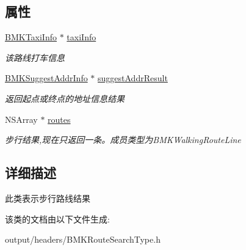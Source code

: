 \subsection*{属性}
\begin{DoxyCompactItemize}
\item 
\hypertarget{interface_b_m_k_walking_route_result_a64e1ed0711dbed93a53cce9f3fd5b477}{}\hyperlink{interface_b_m_k_taxi_info}{B\+M\+K\+Taxi\+Info} $\ast$ \hyperlink{interface_b_m_k_walking_route_result_a64e1ed0711dbed93a53cce9f3fd5b477}{taxi\+Info}\label{interface_b_m_k_walking_route_result_a64e1ed0711dbed93a53cce9f3fd5b477}

\begin{DoxyCompactList}\small\item\em 该路线打车信息 \end{DoxyCompactList}\item 
\hypertarget{interface_b_m_k_walking_route_result_aa609ce663bd13a0c2a96df209d3adc67}{}\hyperlink{interface_b_m_k_suggest_addr_info}{B\+M\+K\+Suggest\+Addr\+Info} $\ast$ \hyperlink{interface_b_m_k_walking_route_result_aa609ce663bd13a0c2a96df209d3adc67}{suggest\+Addr\+Result}\label{interface_b_m_k_walking_route_result_aa609ce663bd13a0c2a96df209d3adc67}

\begin{DoxyCompactList}\small\item\em 返回起点或终点的地址信息结果 \end{DoxyCompactList}\item 
\hypertarget{interface_b_m_k_walking_route_result_a5d3582bcf623a0a164e68d4bc9b329f3}{}N\+S\+Array $\ast$ \hyperlink{interface_b_m_k_walking_route_result_a5d3582bcf623a0a164e68d4bc9b329f3}{routes}\label{interface_b_m_k_walking_route_result_a5d3582bcf623a0a164e68d4bc9b329f3}

\begin{DoxyCompactList}\small\item\em 步行结果,现在只返回一条。成员类型为\+B\+M\+K\+Walking\+Route\+Line \end{DoxyCompactList}\end{DoxyCompactItemize}


\subsection{详细描述}
此类表示步行路线结果 

该类的文档由以下文件生成\+:\begin{DoxyCompactItemize}
\item 
output/headers/B\+M\+K\+Route\+Search\+Type.\+h\end{DoxyCompactItemize}
